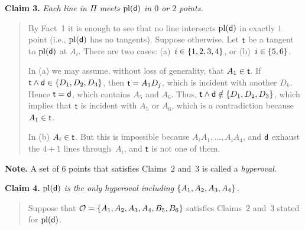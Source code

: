 \begin{solution}
\begin{description}
        \textbf{Claim 3.} \textit{Each line in\/ $\Pi$ meets $\operatorname{pl}(\mathsf d)$ in\/ $0$ or\/ $2$ points.}

        \begin{quote}
            By Fact~1 it is enough to see that no line intersects $\operatorname{pl}(\mathsf d)$ in exactly $1$ point (i.e., $\operatorname{pl}(\mathsf d)$ has no tangents). Suppose otherwise. Let $\mathsf t$ be a tangent to $\operatorname{pl}(\mathsf d)$ at $A_i$. There are two cases: (a)~$i\in\{1,2,3,4\}$, or (b)~$i\in\{5,6\}$.
            
            In (a) we may assume, without loss of generality, that $A_1\in\mathsf t$. If $\mathsf t\wedge\mathsf d\in\{D_1,D_2,D_3\}$, then $\mathsf t=A_1D_j$, which is incident with another $D_k$. Hence $\mathsf t=\mathsf d$, which contains $A_5$ and $A_6$. Thus, $\mathsf t\wedge\mathsf d\notin\{D_1,D_2,D_3\}$, which implies that  $\mathsf t$ is incident with $A_5$ or $A_6$, which is a contradiction because $A_1\in\mathsf t$.

            In (b) $A_i\in\mathsf t$. But this is impossible because $A_iA_1,\dots, A_iA_4$, and $\mathsf d$ exhaust the $4+1$ lines through~$A_i$, and $\mathsf t$ is not one of them.
        \end{quote}

        \textbf{Note.} A set of $6$ points that satisfies Claims~2 and~3 is called a \textsl{hyperoval}.

        \textbf{Claim 4.} \textit{$\operatorname{pl}(\mathsf d)$ is the only hyperoval including\/ $\{A_1,A_2,A_3,A_4\}$.}

        \begin{quote}
            Suppose that $\mathcal O=\{A_1,A_2,A_3,A_4,B_5,B_6\}$ satisfies Claims~2 and~3 stated for $\operatorname{pl}(\mathsf d)$.


\end{quote}
\end{description}
\end{solution}
